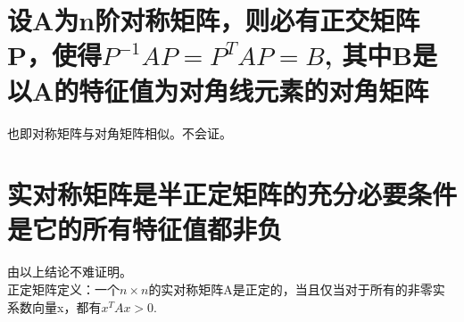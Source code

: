 \documentclass[]{article}
\begin{document}
\section{设A为n阶对称矩阵，则必有正交矩阵P，使得$ P^{-1}AP = P^TAP = B $, 其中B是以A的特征值为对角线元素的对角矩阵}
也即对称矩阵与对角矩阵相似。不会证。

\section{实对称矩阵是半正定矩阵的充分必要条件是它的所有特征值都非负}
由以上结论不难证明。\\
正定矩阵定义：一个$ n \times n $的实对称矩阵A是正定的，当且仅当对于所有的非零实系数向量x，都有$ x^T A x > 0 $.
\end{document}
